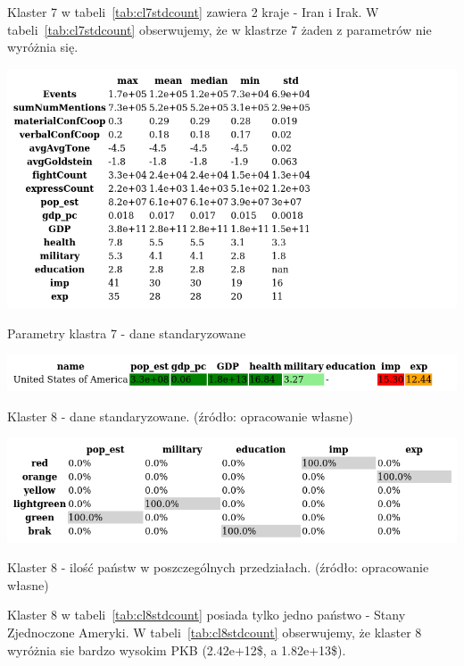 \documentclass[11pt]{report}
\begin{document}
    Klaster 7 w tabeli~\ref{tab:cl7stdcount} zawiera 2 kraje - Iran i Irak.
    W tabeli~\ref{tab:cl7stdcount} obserwujemy, że w klastrze 7 żaden z parametrów nie wyróżnia się.

    \begin{table}[!htp]
        \centering
        \includegraphics[width=\linewidth]{tables/CLUST/desc/clust7std_desc.png}
        \caption{Parametry klastra 7 - dane standaryzowane}
        \label{tab:cl7std_desc}
    \end{table}

    \begin{table}[!htp]
        \centering
        \includegraphics[width=\linewidth]{tables/CLUST/cluster8stdkmeans.png}
        \caption{Klaster 8 - dane standaryzowane. (źródło: opracowanie własne)}
        \label{tab:cl8std}
    \end{table}

    \begin{table}[!htp]
        \centering
        \includegraphics[width=\linewidth]{tables/CLUST/cluster8stdkmeanscount.png}
        \caption{Klaster 8 - ilość państw w poszczególnych przedziałach. (źródło: opracowanie własne)}
        \label{tab:cl8stdcount}
    \end{table}

    Klaster 8 w tabeli~\ref{tab:cl8stdcount} posiada tylko jedno państwo - Stany Zjednoczone Ameryki.
    W tabeli~\ref{tab:cl8stdcount} obserwujemy, że klaster 8 wyróżnia sie bardzo wysokim PKB (2.42e+12\$, a 1.82e+13\$).
\end{document}
